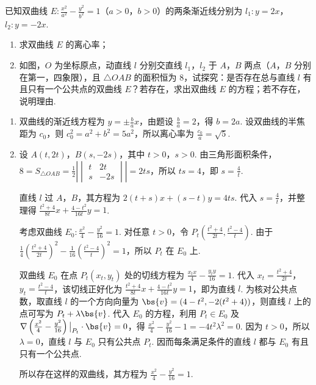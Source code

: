 \begin{problem}
已知双曲线 \(E: \frac{x^2}{a^2} - \frac{y^2}{b^2} = 1\)（\(a > 0\)，\(b > 0\)）的两条渐近线分别为 \(l_1: y = 2x\)，\(l_2: y = -2x\).

\begin{enumerate}
\item 求双曲线 \(E\) 的离心率；
\item 如图，\(O\) 为坐标原点，动直线 \(l\) 分别交直线 \(l_1\)，\(l_2\) 于 \(A\)，\(B\) 两点（\(A\)，\(B\) 分别在第一，四象限），且 \(\triangle OAB\) 的面积恒为 \(8\)，试探究：是否存在总与直线 \(l\) 有且只有一个公共点的双曲线 \(E\)？若存在，求出双曲线 \(E\) 的方程；若不存在，说明理由.
\end{enumerate}

\end{problem}

\begin{solution}
\begin{enumerate}
\item 双曲线的渐近线方程为 \(y=\pm\frac{b}{a}x\)，由题设 \(\frac{b}{a}=2\)，得 \(b=2a\). 设双曲线的半焦距为 \(c_0\)，则 \(c_0^2=a^2+b^2=5a^2\)，所以离心率为 \(\frac{c_0}{a}=\sqrt{5}\).

\item 设 \(A(t,2t)\)，\(B(s,-2s)\)，其中 \(t>0\)，\(s>0\). 由三角形面积条件，
\(8=S_{\triangle OAB}=\frac{1}{2}\left|\begin{vmatrix}t&2t\\s&-2s\end{vmatrix}\right|=2ts\)，所以 \(ts=4\)，即 \(s=\frac{4}{t}\).

直线 \(l\) 过 \(A\)，\(B\)，其方程为 \(2(t+s)x+(s-t)y=4ts\). 代入 \(s=\frac{4}{t}\)，并整理得
\(\frac{t^2+4}{8t}x+\frac{4-t^2}{16t}y=1\).

考虑双曲线 \(E_0:\frac{x^2}{4}-\frac{y^2}{16}=1\). 对任意 \(t>0\)，令
\(P_t\left(\frac{t^2+4}{2t},\frac{t^2-4}{t}\right)\). 由于
\(\frac{1}{4}\left(\frac{t^2+4}{2t}\right)^2-\frac{1}{16}\left(\frac{t^2-4}{t}\right)^2=1\)，所以 \(P_t\) 在 \(E_0\) 上.

双曲线 \(E_0\) 在点 \(P_t(x_t,y_t)\) 处的切线方程为 \(\frac{x_tx}{4}-\frac{y_ty}{16}=1\). 代入 \(x_t=\frac{t^2+4}{2t}\)，\(y_t=\frac{t^2-4}{t}\)，该切线正好化为
\(\frac{t^2+4}{8t}x+\frac{4-t^2}{16t}y=1\)，即为直线 \(l\). 为核对公共点数，取直线 \(l\) 的一个方向向量为 \(\bs{v}=(4-t^2,-2(t^2+4))\)，则直线 \(l\) 上的点可写为 \(P_t+\lambda\bs{v}\). 代入 \(E_0\) 的方程，利用 \(P_t\in E_0\) 及
\(\nabla\left(\frac{x^2}{4}-\frac{y^2}{16}\right)\big|_{P_t}\cdot\bs{v}=0\)，得
\(\frac{x^2}{4}-\frac{y^2}{16}-1=-4t^2\lambda^2=0\). 因为 \(t>0\)，所以 \(\lambda=0\)，直线 \(l\) 与 \(E_0\) 只有公共点 \(P_t\). 因而每条满足条件的直线 \(l\) 都与 \(E_0\) 有且只有一个公共点.

所以存在这样的双曲线，其方程为 \(\frac{x^2}{4}-\frac{y^2}{16}=1\).
\end{enumerate}
\end{solution}

